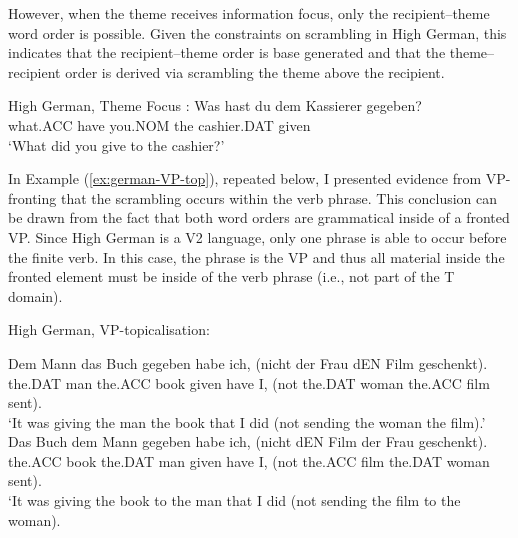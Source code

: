 However, when the theme receives information focus, only the recipient--theme word order is possible. Given the constraints on scrambling in High German, this indicates that the recipient--theme order is base generated and that the theme--recipient order is derived via scrambling the theme above the recipient.

\begin{exe}
	\ex High German, Theme Focus \citep{Choi.1996}:\label{ex:hg-theme-focus}
	\gll Was hast du dem Kassierer gegeben?\\
what.ACC have you.NOM the cashier.DAT given\\
\trans `What did you give to the cashier?'

\begin{xlist}

\end{xlist}
\end{exe}

In Example (\ref{ex:german-VP-top}), repeated below, I presented evidence from VP-fronting that the scrambling occurs within the verb phrase. This conclusion can be drawn from the fact that both word orders are grammatical inside of a fronted VP. Since High German is a V2 language, only one phrase is able to occur before the finite verb. In this case, the phrase is the VP and thus all material inside the fronted element must be inside of the verb phrase (i.e., not part of the T domain).

	\begin{exe}
		 High German, VP-topicalisation:
		\begin{xlist}
			\ex \gll  Dem Mann das Buch gegeben habe ich, (nicht der Frau dEN Film geschenkt).\\
			the.DAT man the.ACC book given have I, (not the.DAT woman the.ACC film sent).\\
			\trans `It was giving the man the book that I did (not sending the woman the film).'
			\ex \gll Das Buch dem Mann gegeben habe ich, (nicht dEN Film der Frau geschenkt).\\
			the.ACC book the.DAT man given have I, (not the.ACC film the.DAT woman sent).\\
			\trans `It was giving the book to the man that I did (not sending the film to the woman).\\
		\end{xlist}
	\end{exe}

